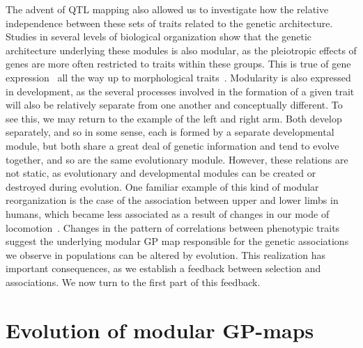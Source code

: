 \begin{refsection}
The advent of QTL mapping also allowed us to investigate how the
relative independence between these sets of traits related to the
genetic architecture. Studies in several levels of biological
organization show that the genetic architecture underlying these modules
is also modular, as the pleiotropic effects of genes are more often
restricted to traits within these groups. This is true of gene
expression~\parencite{Hartwell1999-as, Segal2003-oq} all the way up to
morphological traits~\parencite{Mezey2000-rs}. Modularity is also expressed
in development, as the several processes involved in the formation of a
given trait will also be relatively separate from one another and
conceptually different. To see this, we may return to the example of the
left and right arm. Both develop separately, and so in some sense, each
is formed by a separate developmental module, but both share a great
deal of genetic information and tend to evolve together, and so are the same
evolutionary module. However, these relations are not static, as
evolutionary and developmental modules can be created or destroyed
during evolution. One familiar example of this kind of modular
reorganization is the case of the association between upper and lower
limbs in humans, which became less associated as a result of changes in
our mode of locomotion~\parencite{Young2010-rm}. Changes in the pattern of
correlations between phenotypic traits suggest the underlying modular GP
map responsible for the genetic associations we observe in populations
can be altered by evolution. This realization has important
consequences, as we establish a feedback between selection and
associations. We now turn to the first part of this feedback.

\section{Evolution of modular GP-maps}


\end{refsection}
